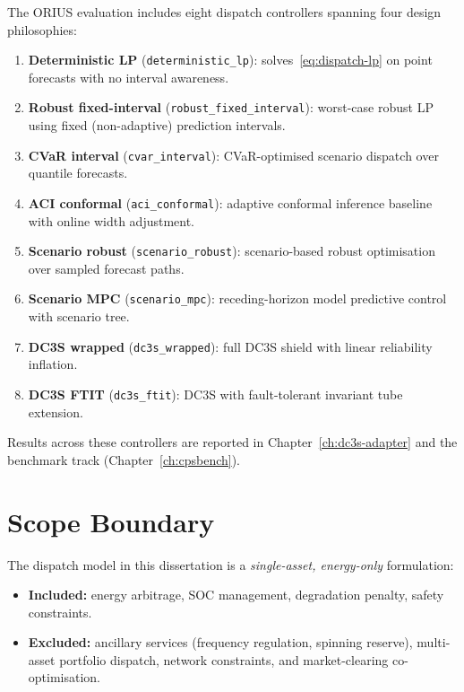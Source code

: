 The ORIUS evaluation includes eight dispatch controllers spanning four
design philosophies:

\begin{enumerate}
  \item \textbf{Deterministic LP} (\texttt{deterministic\_lp}):
    solves~\eqref{eq:dispatch-lp} on point forecasts with no interval
    awareness.
  \item \textbf{Robust fixed-interval} (\texttt{robust\_fixed\_interval}):
    worst-case robust LP using fixed (non-adaptive) prediction intervals.
  \item \textbf{CVaR interval} (\texttt{cvar\_interval}):
    CVaR-optimised scenario dispatch over quantile forecasts.
  \item \textbf{ACI conformal} (\texttt{aci\_conformal}):
    adaptive conformal inference baseline with online width adjustment.
  \item \textbf{Scenario robust} (\texttt{scenario\_robust}):
    scenario-based robust optimisation over sampled forecast paths.
  \item \textbf{Scenario MPC} (\texttt{scenario\_mpc}):
    receding-horizon model predictive control with scenario tree.
  \item \textbf{DC3S wrapped} (\texttt{dc3s\_wrapped}):
    full DC3S shield with linear reliability inflation.
  \item \textbf{DC3S FTIT} (\texttt{dc3s\_ftit}):
    DC3S with fault-tolerant invariant tube extension.
\end{enumerate}

Results across these controllers are reported in
Chapter~\ref{ch:dc3s-adapter} and the benchmark track
(Chapter~\ref{ch:cpsbench}).

\section{Scope Boundary}

The dispatch model in this dissertation is a \emph{single-asset, energy-only}
formulation:

\begin{itemize}
  \item \textbf{Included:} energy arbitrage, SOC management, degradation
    penalty, safety constraints.
  \item \textbf{Excluded:} ancillary services (frequency regulation, spinning
    reserve), multi-asset portfolio dispatch, network constraints, and
    market-clearing co-optimisation.
\end{itemize}

